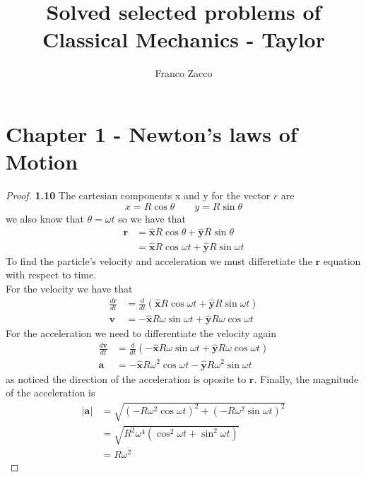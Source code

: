 \documentclass[11pt]{article}
\title{\textbf{Solved selected problems of Classical Mechanics - Taylor}}
\author{Franco Zacco}
\date{}
\newcommand{\hatx}{\bm{\hat{x}}}
\newcommand{\haty}{\bm{\hat{y}}}
\begin{document}
\maketitle
\thispagestyle{empty}

\section*{Chapter 1 - Newton's laws of Motion}

	\begin{proof}{\textbf{1.10}}
        The cartesian components x and y for the vector $r$ are 
        $$x = R \cos{\theta} \quad\quad y = R \sin{\theta}$$
        we also know that $\theta = \omega t$
        so we have that
        \begin{align*}
            \bm{r} &= \hatx R \cos{\theta}  + \haty R \sin{\theta} \\
                   &= \hatx R \cos{\omega t} + \haty R \sin{\omega t}
        \end{align*}
        To find the particle's velocity and acceleration we must differetiate
        the $\bm{r}$ equation with respect to time.\\
        For the velocity we have that 
        \begin{align*}
            \frac{d\bm{r}}{dt} &= \frac{d}{dt}(\hatx R \cos{\omega t}  + \haty R \sin{\omega t}) \\
                        \bm{v} &= - \hatx R \omega \sin{\omega t} + \haty R \omega \cos{\omega t}
        \end{align*}
        For the acceleration we need to differentiate the velocity again 
        \begin{align*}
            \frac{d\bm{v}}{dt} &= \frac{d}{dt}(- \hatx R \omega \sin{\omega t} + \haty R \omega \cos{\omega t}) \\
                        \bm{a} &= - \hatx R \omega^2 \cos{\omega t} - \haty R \omega^2 \sin{\omega t}
        \end{align*}
        as noticed the direction of the acceleration is oposite to $\bm{r}$.
        Finally, the magnitude of the acceleration is
        \begin{align*}
            |\bm{a}| &= \sqrt{(-R \omega^2 \cos{\omega t})^2 + (-R \omega^2 \sin{\omega t})^2} \\
                     &= \sqrt{R^2 \omega^4(\cos^2{\omega t} + \sin^2{\omega t})} \\
                     &= R \omega^2
        \end{align*}
        \end{proof}
\end{document}
